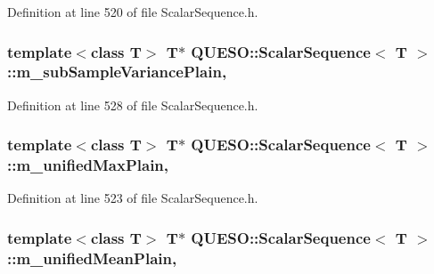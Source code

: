 Definition at line 520 of file Scalar\-Sequence.\-h.

\hypertarget{class_q_u_e_s_o_1_1_scalar_sequence_a50930b9c1b76c7860c2613676d2b58c3}{
\subsubsection[{m\-\_\-sub\-Sample\-Variance\-Plain}]{\setlength{\rightskip}{0pt plus 5cm}template$<$class T$>$ T$\ast$ {\bf Q\-U\-E\-S\-O\-::\-Scalar\-Sequence}$<$ T $>$\-::m\-\_\-sub\-Sample\-Variance\-Plain\hspace{0.3cm}{\ttfamily [mutable]}, {\ttfamily [private]}}}\label{class_q_u_e_s_o_1_1_scalar_sequence_a50930b9c1b76c7860c2613676d2b58c3}


Definition at line 528 of file Scalar\-Sequence.\-h.

\hypertarget{class_q_u_e_s_o_1_1_scalar_sequence_a47ae40e7381ca7407e447052bd2c2469}{
\subsubsection[{m\-\_\-unified\-Max\-Plain}]{\setlength{\rightskip}{0pt plus 5cm}template$<$class T$>$ T$\ast$ {\bf Q\-U\-E\-S\-O\-::\-Scalar\-Sequence}$<$ T $>$\-::m\-\_\-unified\-Max\-Plain\hspace{0.3cm}{\ttfamily [mutable]}, {\ttfamily [private]}}}\label{class_q_u_e_s_o_1_1_scalar_sequence_a47ae40e7381ca7407e447052bd2c2469}


Definition at line 523 of file Scalar\-Sequence.\-h.

\hypertarget{class_q_u_e_s_o_1_1_scalar_sequence_a8a3c141c138c215c8b3672b2efb32108}{
\subsubsection[{m\-\_\-unified\-Mean\-Plain}]{\setlength{\rightskip}{0pt plus 5cm}template$<$class T$>$ T$\ast$ {\bf Q\-U\-E\-S\-O\-::\-Scalar\-Sequence}$<$ T $>$\-::m\-\_\-unified\-Mean\-Plain\hspace{0.3cm}{\ttfamily [mutable]}, {\ttfamily [private]}}}\label{class_q_u_e_s_o_1_1_scalar_sequence_a8a3c141c138c215c8b3672b2efb32108}


